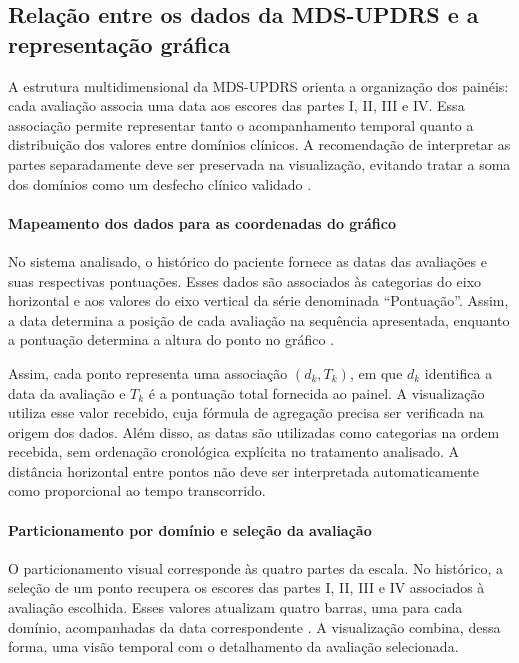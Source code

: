 \subsection{Relação entre os dados da MDS-UPDRS e a representação gráfica}
\label{subsec:dados-mds-graficos}

A estrutura multidimensional da MDS-UPDRS orienta a organização dos painéis: cada avaliação associa uma data aos escores das partes I, II, III e IV. Essa associação permite representar tanto o acompanhamento temporal quanto a distribuição dos valores entre domínios clínicos. A recomendação de interpretar as partes separadamente deve ser preservada na visualização, evitando tratar a soma dos domínios como um desfecho clínico validado \cite{Goetz2008}.

\paragraph{Mapeamento dos dados para as coordenadas do gráfico}
No sistema analisado, o histórico do paciente fornece as datas das avaliações e suas respectivas pontuações. Esses dados são associados às categorias do eixo horizontal e aos valores do eixo vertical da série denominada ``Pontuação''. Assim, a data determina a posição de cada avaliação na sequência apresentada, enquanto a pontuação determina a altura do ponto no gráfico \cite{parkinsonDashboardFront2026}.

Assim, cada ponto representa uma associação $(d_k,T_k)$, em que $d_k$ identifica a data da avaliação e $T_k$ é a pontuação total fornecida ao painel. A visualização utiliza esse valor recebido, cuja fórmula de agregação precisa ser verificada na origem dos dados. Além disso, as datas são utilizadas como categorias na ordem recebida, sem ordenação cronológica explícita no tratamento analisado. A distância horizontal entre pontos não deve ser interpretada automaticamente como proporcional ao tempo transcorrido.

\paragraph{Particionamento por domínio e seleção da avaliação}
O particionamento visual corresponde às quatro partes da escala. No histórico, a seleção de um ponto recupera os escores das partes I, II, III e IV associados à avaliação escolhida. Esses valores atualizam quatro barras, uma para cada domínio, acompanhadas da data correspondente \cite{parkinsonDashboardFront2026}. A visualização combina, dessa forma, uma visão temporal com o detalhamento da avaliação selecionada.

